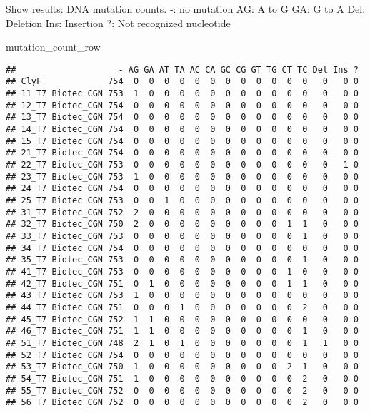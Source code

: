 \documentclass[
]{article}
\newenvironment{Shaded}{\begin{snugshade}}{\end{snugshade}}
\newcommand{\NormalTok}[1]{#1}
\begin{document}
Show results: DNA mutation counts. -: no mutation AG: A to G GA: G to A
Del: Deletion Ins: Insertion ?: Not recognized nucleotide

\begin{Shaded}
\begin{Highlighting}[]
\NormalTok{mutation\_count\_row}
\end{Highlighting}
\end{Shaded}

\begin{verbatim}
##                    - AG GA AT TA AC CA GC CG GT TG CT TC Del Ins ?
## ClyF             754  0  0  0  0  0  0  0  0  0  0  0  0   0   0 0
## 11_T7 Biotec_CGN 753  1  0  0  0  0  0  0  0  0  0  0  0   0   0 0
## 12_T7 Biotec_CGN 754  0  0  0  0  0  0  0  0  0  0  0  0   0   0 0
## 13_T7 Biotec_CGN 754  0  0  0  0  0  0  0  0  0  0  0  0   0   0 0
## 14_T7 Biotec_CGN 754  0  0  0  0  0  0  0  0  0  0  0  0   0   0 0
## 15_T7 Biotec_CGN 754  0  0  0  0  0  0  0  0  0  0  0  0   0   0 0
## 21_T7 Biotec_CGN 754  0  0  0  0  0  0  0  0  0  0  0  0   0   0 0
## 22_T7 Biotec_CGN 753  0  0  0  0  0  0  0  0  0  0  0  0   0   1 0
## 23_T7 Biotec_CGN 753  1  0  0  0  0  0  0  0  0  0  0  0   0   0 0
## 24_T7 Biotec_CGN 754  0  0  0  0  0  0  0  0  0  0  0  0   0   0 0
## 25_T7 Biotec_CGN 753  0  0  1  0  0  0  0  0  0  0  0  0   0   0 0
## 31_T7 Biotec_CGN 752  2  0  0  0  0  0  0  0  0  0  0  0   0   0 0
## 32_T7 Biotec_CGN 750  2  0  0  0  0  0  0  0  0  0  1  1   0   0 0
## 33_T7 Biotec_CGN 753  0  0  0  0  0  0  0  0  0  0  0  1   0   0 0
## 34_T7 Biotec_CGN 754  0  0  0  0  0  0  0  0  0  0  0  0   0   0 0
## 35_T7 Biotec_CGN 753  0  0  0  0  0  0  0  0  0  0  0  1   0   0 0
## 41_T7 Biotec_CGN 753  0  0  0  0  0  0  0  0  0  0  1  0   0   0 0
## 42_T7 Biotec_CGN 751  0  1  0  0  0  0  0  0  0  0  1  1   0   0 0
## 43_T7 Biotec_CGN 753  1  0  0  0  0  0  0  0  0  0  0  0   0   0 0
## 44_T7 Biotec_CGN 751  0  0  0  1  0  0  0  0  0  0  0  2   0   0 0
## 45_T7 Biotec_CGN 752  1  1  0  0  0  0  0  0  0  0  0  0   0   0 0
## 46_T7 Biotec_CGN 751  1  1  0  0  0  0  0  0  0  0  0  1   0   0 0
## 51_T7 Biotec_CGN 748  2  1  0  1  0  0  0  0  0  0  0  1   1   0 0
## 52_T7 Biotec_CGN 754  0  0  0  0  0  0  0  0  0  0  0  0   0   0 0
## 53_T7 Biotec_CGN 750  1  0  0  0  0  0  0  0  0  0  2  1   0   0 0
## 54_T7 Biotec_CGN 751  1  0  0  0  0  0  0  0  0  0  0  2   0   0 0
## 55_T7 Biotec_CGN 752  0  0  0  0  0  0  0  0  0  0  0  2   0   0 0
## 56_T7 Biotec_CGN 752  0  0  0  0  0  0  0  0  0  0  0  2   0   0 0
\end{verbatim}
\end{document}
